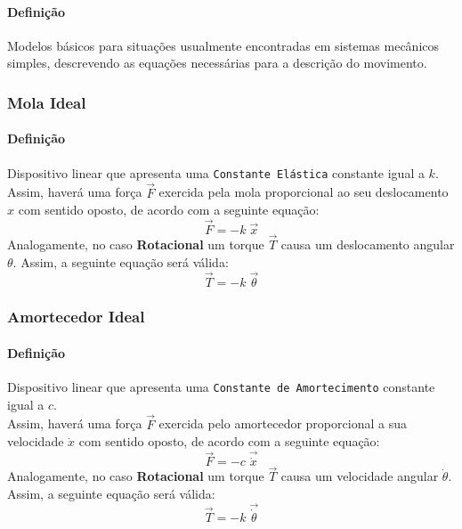 \documentclass{article}
\begin{document}
    \paragraph{Definição}Modelos básicos para situações usualmente encontradas em sistemas mecânicos simples, descrevendo as equações necessárias para a descrição do movimento.
    \begin{multicols}{2}
        \raggedcolumns
        \subsubsection{Mola Ideal}
            \paragraph{Definição}Dispositivo linear que apresenta uma \texttt{Constante Elástica} constante igual a $k$.\\

            Assim, haverá uma força $\vec{F}$ exercida pela mola proporcional ao seu deslocamento $x$ com sentido oposto, de acordo com a seguinte equação:
                \begin{equation}
                    \boxed{
                        \vec{F} = - k\;\vec{x}
                    }
                \end{equation}
            Analogamente, no caso \textbf{Rotacional} um torque $\vec{T}$ causa um deslocamento angular $\theta$. Assim, a seguinte equação será válida:
                \begin{equation}
                    \boxed{
                        \vec{T} = - k\;\vec{\theta}
                    }
                \end{equation}

        \columnbreak

        \subsubsection{Amortecedor Ideal}
            \paragraph{Definição}Dispositivo linear que apresenta uma \texttt{Constante de Amortecimento} constante igual a $c$.\\

            Assim, haverá uma força $\vec{F}$ exercida pelo amortecedor  proporcional a sua velocidade $\dot{x}$ com sentido oposto, de acordo com a seguinte equação:
                \begin{equation}
                    \boxed{
                        \vec{F} = - c\;\vec{\dot{x}}
                    }
                \end{equation}
            Analogamente, no caso \textbf{Rotacional} um torque $\vec{T}$ causa um velocidade angular $\dot{\theta}$. Assim, a seguinte equação será válida:
                \begin{equation}
                    \boxed{
                        \vec{T} = - k\;\vec{\dot{\theta}}
                    }
                \end{equation}
    \end{multicols}\noindent
\newpage
\end{document}
